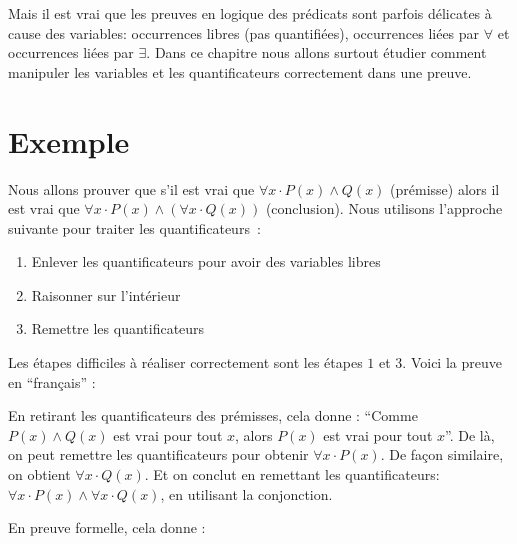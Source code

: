Mais il est vrai que les preuves en logique des prédicats sont parfois délicates à cause des variables:
occurrences libres (pas quantifiées), occurrences liées par $\forall$ et occurrences liées par $\exists$.
Dans ce chapitre nous allons surtout étudier comment manipuler les variables et les quantificateurs
correctement dans une preuve.

\section{Exemple}

Nous allons prouver que s'il est vrai que
$\forall x \cdot P(x) \wedge Q(x)$ (prémisse)
alors il est vrai que $\forall x \cdot P(x)\wedge(\forall x \cdot Q(x))$ (conclusion).
Nous utilisons l'approche suivante pour traiter les quantificateurs~:
\begin{center}
\begin{enumerate}
	\item Enlever les quantificateurs pour avoir des variables libres\\
	\item Raisonner sur l'intérieur\\
	\item Remettre les quantificateurs\\
\end{enumerate}
\end{center}
Les étapes difficiles à réaliser correctement sont les étapes $1$ et $3$. Voici la preuve en ``français'' :

En retirant les quantificateurs des prémisses, cela donne :
``Comme $P(x) \wedge Q(x)$ est vrai pour tout $x$, alors $P(x)$ est vrai pour tout $x$''. 
De là, on peut remettre les quantificateurs pour obtenir $\forall x \cdot P(x)$. De façon similaire, on obtient $\forall x \cdot Q(x)$. Et on conclut en remettant les quantificateurs: $\forall x \cdot P(x) \wedge \forall x \cdot Q(x)$, en utilisant la conjonction.

En preuve formelle, cela donne :

\begin{center}
\end{center}

